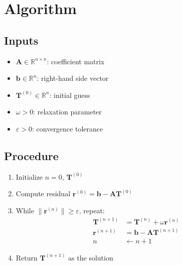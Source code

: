 \documentclass[12pt]{article}
\begin{document}
\section*{Algorithm}

\subsection*{Inputs}
\begin{itemize}
    \item \( \mathbf{A} \in \mathbb{R}^{n \times n} \): coefficient matrix
    \item \( \mathbf{b} \in \mathbb{R}^{n} \): right-hand side vector
    \item \( \mathbf{T}^{(0)} \in \mathbb{R}^{n} \): initial guess
    \item \( \omega > 0 \): relaxation parameter
    \item \( \varepsilon > 0 \): convergence tolerance
\end{itemize}

\subsection*{Procedure}
\begin{enumerate}
    \item Initialize \( n = 0 \), \( \mathbf{T}^{(0)} \)
    \item Compute residual \( \mathbf{r}^{(0)} = \mathbf{b} - \mathbf{A} \mathbf{T}^{(0)} \)
    \item While \( \| \mathbf{r}^{(n)} \| \geq \varepsilon \), repeat:
    \begin{align*}
        \mathbf{T}^{(n+1)} &= \mathbf{T}^{(n)} + \omega \mathbf{r}^{(n)} \\
        \mathbf{r}^{(n+1)} &= \mathbf{b} - \mathbf{A} \mathbf{T}^{(n+1)} \\
        n &\leftarrow n + 1
    \end{align*}
    \item Return \( \mathbf{T}^{(n+1)} \) as the solution
\end{enumerate}
\end{document}
